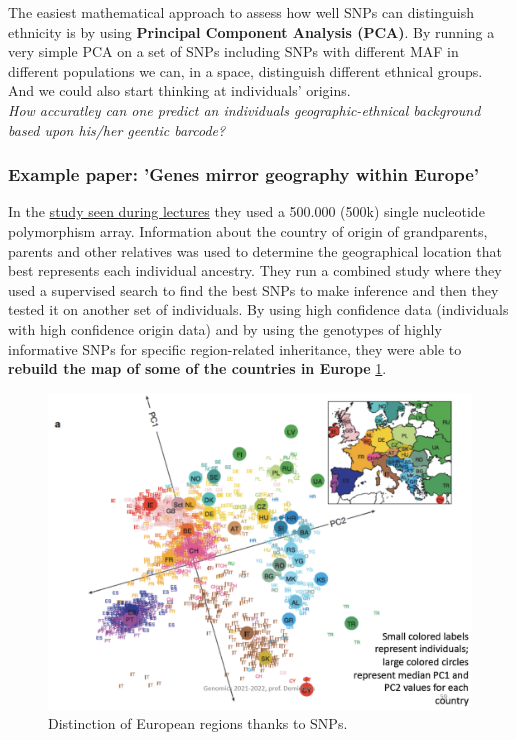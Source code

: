 The easiest mathematical approach to assess how well SNPs can distinguish
ethnicity is by using \textbf{Principal Component Analysis (PCA)}. By running a
very simple PCA on a set of SNPs including SNPs with different MAF in different
populations we can, in a space, distinguish different ethnical groups. And we
could also start thinking at individuals' origins.\\

\emph{How accuratley can one predict an individuals geographic-ethnical
background based upon his/her geentic barcode?}

\subsubsection{Example paper: 'Genes mirror geography within Europe'}

In the \href{https://www.ncbi.nlm.nih.gov/pmc/articles/PMC2735096/}{study seen
during lectures} they used a 500.000 (500k) single nucleotide polymorphism
array. Information about the country of origin of grandparents, parents and
other relatives was used to determine the geographical location that best
represents each individual ancestry. They run a combined study where they used a
supervised search to find the best SNPs to make inference and then they tested
it on another set of individuals. By using high confidence data (individuals
with high confidence origin data) and by using the genotypes of highly
informative SNPs for specific region-related inheritance, they were able to
\textbf{rebuild the map of some of the countries in Europe}
\ref{fig:PCA_countries}. \\

\begin{figure}[ht]
	\centering
	\includegraphics[width=1\textwidth]{PCA.PNG}
	\caption{Distinction of European regions thanks to SNPs.}
	\label{fig:PCA_countries}
\end{figure}

